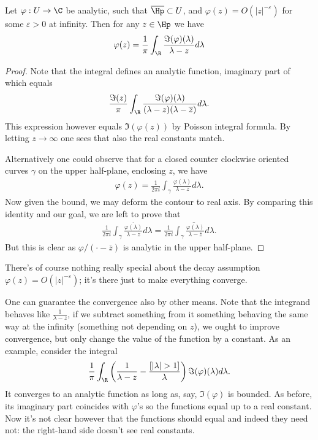 \begin{lause}
	Let $\varphi : U \to \C$ be analytic, such that $\overline{\Hp} \subset U$, and $\varphi(z) = O(|z|^{-\varepsilon})$ for some $\varepsilon > 0$ at infinity. Then for any $z \in \Hp$ we have
	\begin{align*}
		\varphi(z) = \frac{1}{\pi}\int_{\R} \frac{\Im(\varphi)(\lambda)}{\lambda - z} d \lambda
	\end{align*}
\end{lause}
\begin{proof}
	Note that the integral defines an analytic function, imaginary part of which equals
	\begin{align*}
		\frac{\Im(z)}{\pi}\int_{\R} \frac{\Im(\varphi)(\lambda)}{(\lambda - z)(\lambda - \overline{z})} d \lambda.
	\end{align*}
	This expression however equals $\Im(\varphi(z))$ by Poisson integral formula. By letting $z \to \infty$ one sees that also the real constants match.

	Alternatively one could observe that for a closed counter clockwise oriented curves $\gamma$ on the upper half-plane, enclosing $z$, we have
	\begin{align*}
		\varphi(z) = \frac{1}{2\pi i}\int_{\gamma} \frac{\varphi(\lambda)}{\lambda - z} d \lambda.
	\end{align*}
	Now given the bound, we may deform the contour to real axis. By comparing this identity and our goal, we are left to prove that
	\begin{align*}
		\frac{1}{2\pi i}\int_{\gamma} \frac{\overline{\varphi(\lambda)}}{\lambda - z} d \lambda = \frac{1}{2\pi i} \overline{\int_{\gamma} \frac{\varphi(\lambda)}{\lambda - \overline{z}} d \lambda}.
	\end{align*}
	But this is clear as $\varphi/(\cdot - \overline{z})$ is analytic in the upper half-plane.
\end{proof}

There's of course nothing really special about the decay assumption $\varphi(z) = O(|z|^{-\varepsilon})$; it's there just to make everything converge.

One can guarantee the convergence also by other means. Note that the integrand behaves like $\frac{1}{\lambda - z}$, if we subtract something from it something behaving the same way at the infinity (something not depending on $z$), we ought to improve convergence, but only change the value of the function by a constant. As an example, consider the integral
\begin{align}\label{easy_pick_repr}
	\frac{1}{\pi}\int_{\R} \left(\frac{1}{\lambda - z} - \frac{[|\lambda| > 1]}{\lambda} \right) \Im(\varphi)(\lambda)d \lambda.
\end{align}
It converges to an analytic function as long as, say, $ \Im(\varphi)$ is bounded. As before, its imaginary part coincides with $\varphi$'s so the functions equal up to a real constant. Now it's not clear however that the functions should equal and indeed they need not: the right-hand side doesn't see real constants.


